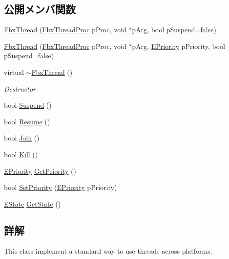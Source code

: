 \subsection*{公開メンバ関数}
\begin{DoxyCompactItemize}
\item 
\hyperlink{class_fbx_thread_ae95d08575b6b014f703d41c2a5b4ac4f}{Fbx\+Thread} (\hyperlink{fbxthread_8h_a3532e8b93c1a30a69124bf8d89280573}{Fbx\+Thread\+Proc} p\+Proc, void $\ast$p\+Arg, bool p\+Suspend=false)
\item 
\hyperlink{class_fbx_thread_a650dcba123703d9da75a2223453d4fd9}{Fbx\+Thread} (\hyperlink{fbxthread_8h_a3532e8b93c1a30a69124bf8d89280573}{Fbx\+Thread\+Proc} p\+Proc, void $\ast$p\+Arg, \hyperlink{class_fbx_thread_a1b7d46235dd8589e03f7a29777f083f2}{E\+Priority} p\+Priority, bool p\+Suspend=false)
\item 
virtual \hyperlink{class_fbx_thread_a1d367585d9ee649aefc1ad6d3625bbfe}{$\sim$\+Fbx\+Thread} ()
\begin{DoxyCompactList}\small\item\em Destructor \end{DoxyCompactList}\item 
bool \hyperlink{class_fbx_thread_a41702b06399443c91e60c70be333d2a5}{Suspend} ()
\item 
bool \hyperlink{class_fbx_thread_a829e856a545af8ca53ac10241f5388fc}{Resume} ()
\item 
bool \hyperlink{class_fbx_thread_a784d4eb2cd3ca88f9f9283c1488467fa}{Join} ()
\item 
bool \hyperlink{class_fbx_thread_a24115ea67bd15a8181051693aef22ba1}{Kill} ()
\item 
\hyperlink{class_fbx_thread_a1b7d46235dd8589e03f7a29777f083f2}{E\+Priority} \hyperlink{class_fbx_thread_a6c7859fdc523e2a4628931a0daf139d0}{Get\+Priority} ()
\item 
bool \hyperlink{class_fbx_thread_a3aad216865d1009cd14bedfcd31bd79e}{Set\+Priority} (\hyperlink{class_fbx_thread_a1b7d46235dd8589e03f7a29777f083f2}{E\+Priority} p\+Priority)
\item 
\hyperlink{class_fbx_thread_a82f55f0fc5f947d4357c8175d05782ff}{E\+State} \hyperlink{class_fbx_thread_a49873956e4054a30dc7e5cc5766b74ca}{Get\+State} ()
\end{DoxyCompactItemize}


\subsection{詳解}
This class implement a standard way to use threads across platforms. 

